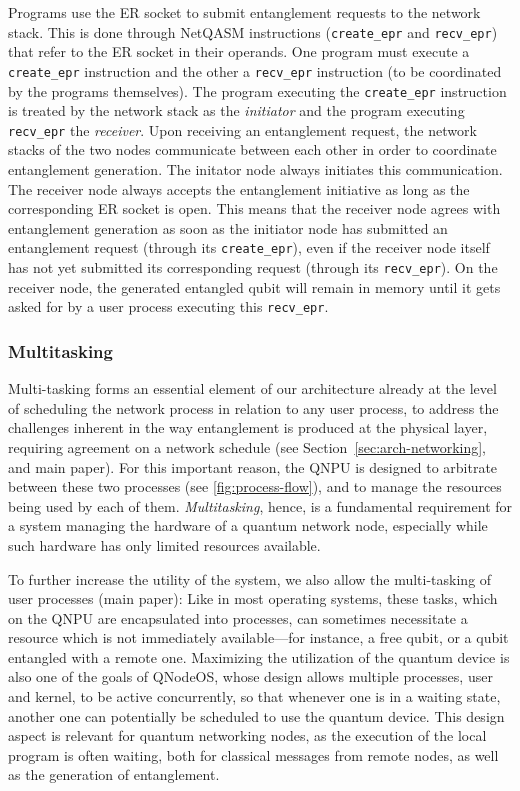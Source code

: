 Programs use the \ac{ER} socket to submit entanglement requests to the network stack. This is done through NetQASM instructions (\texttt{create\_epr} and \texttt{recv\_epr}) that refer to the \ac{ER} socket in their operands. One program must execute a \texttt{create\_epr} instruction and the other a \texttt{recv\_epr} instruction (to be coordinated by the programs themselves). The program executing the \texttt{create\_epr} instruction is treated by the network stack as the \emph{initiator} and the program executing \texttt{recv\_epr} the \emph{receiver}. 
Upon receiving an entanglement request, the network stacks of the two nodes communicate between each other in order to coordinate entanglement generation. The initator node always initiates this communication. The receiver node always accepts the entanglement initiative as long as the corresponding \ac{ER} socket is open. This means that the receiver node agrees with entanglement generation as soon as the initiator node has submitted an entanglement request (through its \texttt{create\_epr}), even if the receiver node itself has not yet submitted its corresponding request (through its \texttt{recv\_epr}). On the receiver node, the generated entangled qubit will remain in memory until it gets asked for by a user process executing this \texttt{recv\_epr}.

\subsubsection{Multitasking}

Multi-tasking forms an essential element of our architecture already at the level of scheduling the network process in relation to any user process, to address the challenges inherent in the way entanglement is produced at the physical layer, requiring agreement on a network schedule (see Section~\ref{sec:arch-networking}, and main paper). For this important reason, the \ac{QNPU} is designed to arbitrate between these two processes (see \cref{fig:process-flow}), and to manage the resources being used by each of them. \emph{Multitasking}, hence, is a fundamental requirement for a system managing the hardware of a quantum network node, especially while such hardware has only limited resources available. 

To further increase the utility of the system, we also allow the multi-tasking of user processes (main paper):
Like in most operating systems, these tasks, which on the \ac{QNPU} are encapsulated into processes, can sometimes necessitate a resource which is not immediately available---for instance, a free qubit, or a qubit entangled with a remote one. Maximizing the utilization of the quantum device is also one of the goals of \ac{QNodeOS}, whose design allows multiple processes, user and kernel, to be active concurrently, so that whenever one is in a waiting state, another one can potentially be scheduled to use the quantum device.  This design aspect is relevant for quantum networking nodes, as the execution of the local program is often waiting, both for classical messages from remote nodes, as well as the generation of entanglement. 


